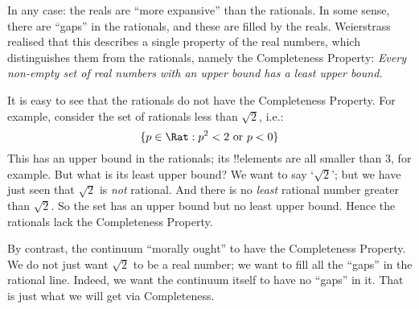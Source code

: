 \documentclass[../../../include/open-logic-section]{subfiles}
\begin{document}
In any case: the reals are ``more expansive'' than the rationals. In some sense, there are ``gaps'' in the rationals, and these are filled by the reals. Weierstrass realised that this describes a single property of the real numbers, which distinguishes them from the rationals, namely the Completeness Property: \emph{Every non-empty set of real numbers with an upper bound has a least upper bound.} 

It is easy to see that the rationals do not have the Completeness Property. For example, consider the set of rationals less than $\sqrt{2}$, i.e.:
\[
	\Setabs{p \in \Rat}{p^2 < 2 \text{ or }p < 0}
\]
This has an upper bound in the rationals; its !!{elements} are all  smaller than $3$, for example. But what is its least upper bound? We want to say `$\sqrt{2}$'; but we have just seen that $\sqrt{2}$ is \emph{not} rational. And there is no \emph{least} rational number greater than $\sqrt{2}$. So the set has an upper bound but no least upper bound. Hence the rationals lack the Completeness Property.

By contrast, the continuum ``morally ought'' to have the Completeness Property. We do not just want $\sqrt{2}$ to be a real number; we want to fill all the ``gaps'' in the rational line. Indeed, we want the continuum itself to have no ``gaps'' in it. That is just what we will get via Completeness.
\end{document}

